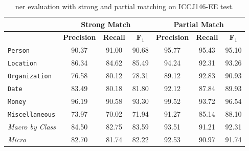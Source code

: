 \begin{table}[tb]
\centering
\caption{\ac{ner} evaluation with strong and partial matching on ICCJ146-EE test.}
\label{tab:ner4type}
\begin{tabular*}{\textwidth}{@{}l@{\extracolsep{\fill}}ccc@{\extracolsep{\fill}}ccc@{}}
\toprule
        & \multicolumn{3}{c}{\textbf{Strong Match}} & \multicolumn{3}{c}{\textbf{Partial Match}} \\ \midrule
        & \textbf{Precision}     & \textbf{Recall}      & \textbf{F$_1$}          & \textbf{Precision}      & \textbf{Recall}      & \textbf{F$_1$}          \\ \midrule
        \texttt{Person}     & 90.37       & 91.00     & 90.68     & 95.77        & 95.43     & 95.10     \\
        \texttt{Location}     & 86.34       & 84.62     & 85.49     & 94.24        & 92.31     & 93.26     \\
        \texttt{Organization}     & 76.58       & 80.12     & 78.31     & 89.12        & 92.83     & 90.93     \\
        \texttt{Date}    & 83.49       & 80.18     & 81.80     & 92.12        & 87.84     & 89.93     \\
        \texttt{Money}   & 96.19       & 90.58     & 93.30     & 99.52        & 93.72     & 96.54     \\
        \texttt{Miscellaneous}    & 73.97       & 70.02     & 71.94     & 91.27        & 85.14     & 88.10     \\ \midrule
\textit{Macro by Class} & 84.50       & 82.75     & 83.59     & 93.51        & 91.21     & 92.31     \\
\textit{Micro} & 82.70       & 81.74     & 82.22     & 92.53        & 90.97     & 91.74     \\ \bottomrule
\end{tabular*}%
\end{table}